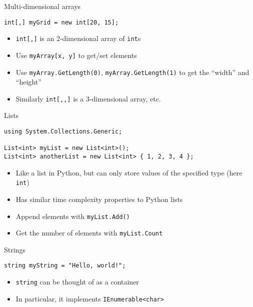 \begin{frame}[fragile]{Multi-dimensional arrays}
    \begin{lstlisting}
int[,] myGrid = new int[20, 15];
    \end{lstlisting}
    \begin{itemize}
        \pause\item \lstinline{int[,]} is an 2-dimensional array of \lstinline{int}s
        \pause\item Use \lstinline{myArray[x, y]} to get/set elements
        \pause\item Use \lstinline{myArray.GetLength(0)}, \lstinline{myArray.GetLength(1)} to get the ``width'' and ``height''
        \pause\item Similarly \lstinline{int[,,]} is a 3-dimensional array, etc.
    \end{itemize}
\end{frame}

\begin{frame}[fragile]{Lists}
    \begin{lstlisting}
using System.Collections.Generic;

List<int> myList = new List<int>();
List<int> anotherList = new List<int> { 1, 2, 3, 4 };
    \end{lstlisting}
	\begin{itemize}
		\pause\item Like a list in Python, but can only store values of the specified type (here \lstinline{int})
		\pause\item Has similar time complexity properties to Python lists
		\pause\item Append elements with \lstinline{myList.Add()}
		\pause\item Get the number of elements with \lstinline{myList.Count}
	\end{itemize}
\end{frame}

\begin{frame}[fragile]{Strings}
    \begin{lstlisting}
string myString = "Hello, world!";
    \end{lstlisting}
	\begin{itemize}
		\pause\item \lstinline{string} can be thought of as a container
		\pause\item In particular, it implements \lstinline{IEnumerable<char>}
	\end{itemize}
\end{frame}

